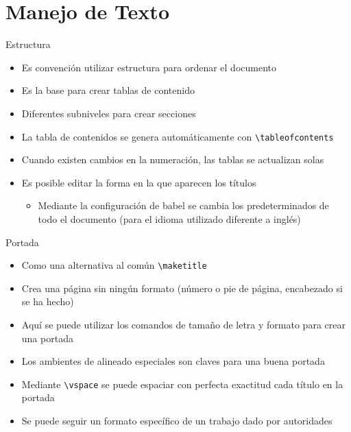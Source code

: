 \documentclass{beamer}
\begin{document}
    \section{Manejo de Texto}
    \begin{frame}{Estructura}
    \begin{itemize}
        \item Es convención utilizar estructura para ordenar el documento
        \item Es la base para crear tablas de contenido
        \item Diferentes subniveles para crear secciones
        \item La tabla de contenidos se genera automáticamente con \texttt{\textbackslash tableofcontents}
        \item Cuando existen cambios en la numeración, las tablas se actualizan solas
        \item Es posible editar la forma en la que aparecen los títulos
        \begin{itemize}
            \item Mediante la configuración de \textsf{babel} se cambia los predeterminados de todo el documento (para el idioma utilizado diferente a inglés)
        \end{itemize}
            \end{itemize}
    \end{frame}
    \begin{frame}{Portada}
     \begin{itemize}
         \item Como una alternativa al común \texttt{\textbackslash maketitle}
         \item Crea una página sin ningún formato (número o pie de página, encabezado si se ha hecho)
         \item Aquí se puede utilizar los comandos de tamaño de letra y formato para crear una portada
         \item Los ambientes de alineado especiales son claves para una buena portada
         \item Mediante \texttt{\textbackslash vspace} se puede espaciar con perfecta exactitud cada título en la portada
         \item Se puede seguir un formato específico de un trabajo dado por autoridades
     \end{itemize}
    \end{frame}
\end{document}
